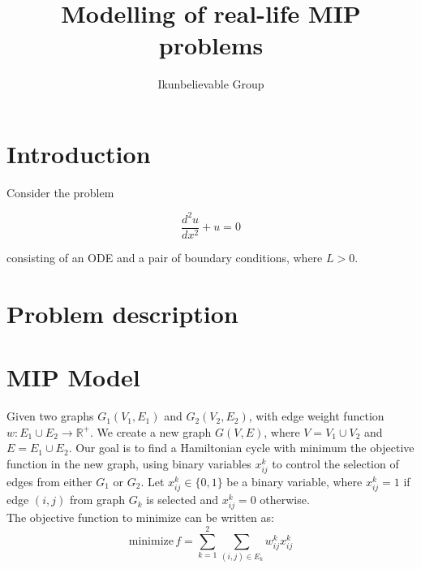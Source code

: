 \documentclass[11pt]{article}
\title{Modelling of real-life MIP problems}
\author{Ikunbelievable Group\footnotemark[1]}
\date{}
\begin{document}
\maketitle

\renewcommand{\thefootnote}{\fnsymbol{footnote}}
\renewcommand{\thefootnote}{\arabic{footnote}}

\section{Introduction}

Consider the problem

\begin{equation*}
  \frac{d^2 u}{d x^2}+u=0
\end{equation*}

consisting of an ODE and a pair of boundary conditions, where $L > 0$.

\section{Problem description}

\section{MIP Model}
Given two graphs $G_1(V_1, E_1)$ and $G_2(V_2, E_2)$, with edge weight function
$w : E_1 \cup E_2 \rightarrow \mathbb{R}^+$. We create a new graph $G(V, E)$,
where $V = V_1 \cup V_2$ and $E = E_1 \cup E_2$. Our goal is to find a
Hamiltonian cycle with minimum the objective function in the new graph, using binary
variables $x_{ij}^k$ to control the selection of edges from either $G_1$ or $G_2$.
Let $x_{ij}^k \in \{0, 1\}$ be a binary variable, where $x_{ij}^k = 1$ if edge $(i, j)$ from graph $G_k$ is selected and $x_{ij}^k = 0$ otherwise.
\\
The objective function to minimize can be written as:
\begin{equation*}
  \text{minimize} \, f = \sum_{k=1}^{2} \sum_{(i,j) \in E_k} w_{ij}^k x_{ij}^k
\end{equation*}
\end{document}
